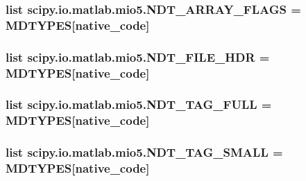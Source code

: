 \subsubsection[{N\+D\+T\+\_\+\+A\+R\+R\+A\+Y\+\_\+\+F\+L\+A\+G\+S}]{\setlength{\rightskip}{0pt plus 5cm}list scipy.\+io.\+matlab.\+mio5.\+N\+D\+T\+\_\+\+A\+R\+R\+A\+Y\+\_\+\+F\+L\+A\+G\+S = M\+D\+T\+Y\+P\+E\+S\mbox{[}native\+\_\+code\mbox{]}}\label{namespacescipy_1_1io_1_1matlab_1_1mio5_a48b9e8b742352906b241bb04cdfe2ed2}
\hypertarget{namespacescipy_1_1io_1_1matlab_1_1mio5_af9703c91d1b044e498a2d282bf8bddad}{}
\subsubsection[{N\+D\+T\+\_\+\+F\+I\+L\+E\+\_\+\+H\+D\+R}]{\setlength{\rightskip}{0pt plus 5cm}list scipy.\+io.\+matlab.\+mio5.\+N\+D\+T\+\_\+\+F\+I\+L\+E\+\_\+\+H\+D\+R = M\+D\+T\+Y\+P\+E\+S\mbox{[}native\+\_\+code\mbox{]}}\label{namespacescipy_1_1io_1_1matlab_1_1mio5_af9703c91d1b044e498a2d282bf8bddad}
\hypertarget{namespacescipy_1_1io_1_1matlab_1_1mio5_a993ddce5977df6877558bfe56bdc4f55}{}
\subsubsection[{N\+D\+T\+\_\+\+T\+A\+G\+\_\+\+F\+U\+L\+L}]{\setlength{\rightskip}{0pt plus 5cm}list scipy.\+io.\+matlab.\+mio5.\+N\+D\+T\+\_\+\+T\+A\+G\+\_\+\+F\+U\+L\+L = M\+D\+T\+Y\+P\+E\+S\mbox{[}native\+\_\+code\mbox{]}}\label{namespacescipy_1_1io_1_1matlab_1_1mio5_a993ddce5977df6877558bfe56bdc4f55}
\hypertarget{namespacescipy_1_1io_1_1matlab_1_1mio5_a26ce091544ce1effcfb5276bad77e7a3}{}
\subsubsection[{N\+D\+T\+\_\+\+T\+A\+G\+\_\+\+S\+M\+A\+L\+L}]{\setlength{\rightskip}{0pt plus 5cm}list scipy.\+io.\+matlab.\+mio5.\+N\+D\+T\+\_\+\+T\+A\+G\+\_\+\+S\+M\+A\+L\+L = M\+D\+T\+Y\+P\+E\+S\mbox{[}native\+\_\+code\mbox{]}}\label{namespacescipy_1_1io_1_1matlab_1_1mio5_a26ce091544ce1effcfb5276bad77e7a3}
